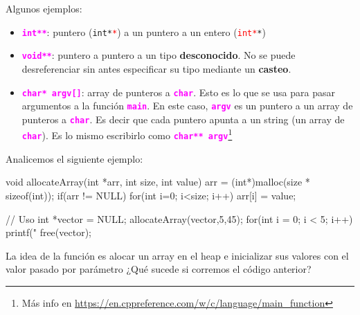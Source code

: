 \documentclass[]{scrartcl}
\newcommand{\hl}[1]{\textcolor{magenta}{\textbf{\texttt{#1}}}}
\begin{document}
Algunos ejemplos:
\begin{itemize}
  \item \hl{int**}: puntero (\texttt{int*\textcolor{red}{*}}) a un puntero a un entero (\texttt{\textcolor{red}{int*}*})
  \item \hl{void**}: puntero a puntero a un tipo \textbf{desconocido}. No se puede desreferenciar sin antes especificar su tipo mediante un \textbf{casteo}.
  \item \hl{char* argv[]}: array de punteros a \hl{char}. Esto es lo que se usa para pasar argumentos a la función \hl{main}. En este caso, \hl{argv} es un puntero a un array de punteros a \hl{char}. Es decir que cada puntero apunta a un string (un array de \hl{char}). Es lo mismo escribirlo como \hl{char** argv}\footnote{Más info en \url{https://en.cppreference.com/w/c/language/main_function}}
        
\end{itemize}

\begin{center}
  \noindent {}
  \label{fig:doble-puntero}
\end{center}

Analicemos el siguiente ejemplo:

\begin{cbox}[]{}
  void allocateArray(int *arr, int size, int value) {
    arr = (int*)malloc(size * sizeof(int));
    if(arr != NULL) {
      for(int i=0; i<size; i++) {
        arr[i] = value;
      }
    }
  }
  
  // Uso
  int *vector = NULL;
  allocateArray(vector,5,45);
  for(int i = 0; i < 5; i++)
    printf("%
  free(vector);
\end{cbox}
\begin{exbox}
  La idea de la función es alocar un array en el heap e inicializar sus valores con el valor pasado por parámetro ¿Qué sucede si corremos el código anterior? 
\end{exbox}
\end{document}
